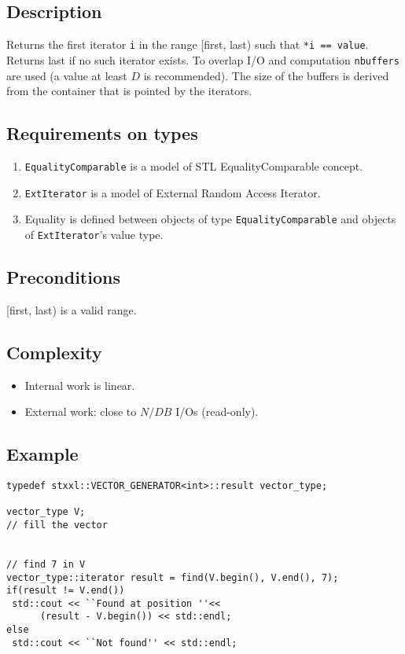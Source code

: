 \documentclass[twoside]{book}
\begin{document}
\subsection*{Description}
Returns the first iterator \texttt{i} in the range [first, last) such
that \texttt{*i == value}. Returns last if no such iterator exists.  
To
overlap I/O and computation \texttt{nbuffers} are used (a value at
least $D$ is recommended). The size of
the buffers is derived from the container that is pointed by the
iterators. 

\subsection*{Requirements on types}
\begin{enumerate}
\item \texttt{EqualityComparable} is a model of STL EqualityComparable
concept.
\item \texttt{ExtIterator} is a model of External Random Access
Iterator. 
\item Equality is defined between objects  of type
\texttt{EqualityComparable} and objects of \texttt{ExtIterator}'s
value type.
\end{enumerate}
\subsection*{Preconditions}
[first, last) is a valid range.
\subsection*{Complexity}
\begin{itemize}
\item Internal work is linear.
\item External work: close to $N/DB$ I/Os (read-only).
\end{itemize}
\subsection*{Example}
\begin{lstlisting}
typedef stxxl::VECTOR_GENERATOR<int>::result vector_type;

vector_type V;
// fill the vector


// find 7 in V
vector_type::iterator result = find(V.begin(), V.end(), 7);
if(result != V.end())
 std::cout << ``Found at position ''<< 
      (result - V.begin()) << std::endl;
else
 std::cout << ``Not found'' << std::endl;
\end{lstlisting}
\end{document}
